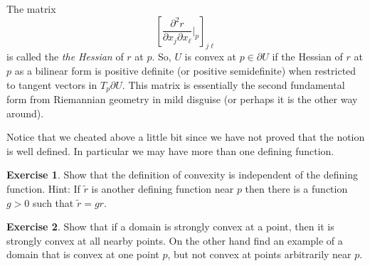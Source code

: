 \documentclass[12pt,openany]{book}
\newcommand{\myindex}[1]{#1\index{#1}}
\theoremstyle{plain}
\theoremstyle{remark}
\theoremstyle{definition}
\newenvironment{exbox}{%
    \def\FrameCommand{\vrule width 1pt \relax\hspace {10pt}}%
    \MakeFramed {\advance \hsize -\width \FrameRestore }%
}{%
    \endMakeFramed
}
\theoremstyle{exercise}
\newtheorem{exercise}{Exercise}[section]
\theoremstyle{example}
\begin{document}
The matrix
\begin{equation*}
\left[ \frac{\partial^2 r}{\partial x_j \partial x_\ell} \Big|_p
\right]_{j\ell}
\end{equation*}
is called the
\emph{\myindex{the Hessian}} of $r$ at $p$.
So, $U$ is convex at $p \in \partial U$ if
the Hessian
of $r$ at $p$ as a bilinear form is positive definite (or positive
semidefinite) when restricted to tangent vectors in $T_p \partial U$.
This matrix is essentially the second fundamental form from Riemannian
geometry in mild disguise (or perhaps it is the other way around).

Notice that we cheated above a little bit since we have not proved that
the notion is well defined.  In particular we may have more than
one defining function.

\begin{exbox}
\begin{exercise}
Show that the definition of convexity is independent of the defining
function.  Hint: If $\tilde{r}$ is another defining function near $p$
then there is a function $g > 0$ such that $\tilde{r} = g r$.
\end{exercise}

\begin{exercise}
Show that if a domain is strongly convex at a point, then it is
strongly convex at all nearby points.  On the other hand find an example of
a domain that is convex at one point $p$, but not convex at points
arbitrarily near $p$.
\end{exercise}
\end{exbox}
\end{document}
